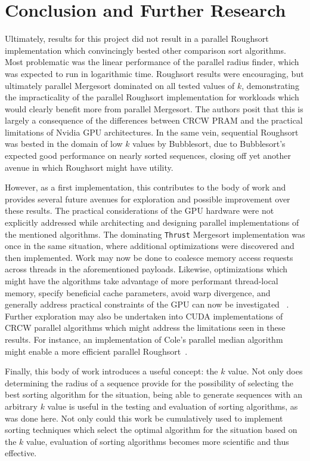 \documentclass[letterpaper, 12pt]{article}
\let\supercite\cite
\renewcommand{\cite}[1]{\textnormal{~\supercite{#1}}}
\begin{document}
\section{Conclusion and Further Research}
  Ultimately, results for this project did not result in a parallel Roughsort implementation which convincingly bested other comparison sort 
  algorithms. Most problematic was the linear performance of the parallel radius finder, which was expected to run in logarithmic time.  Roughsort
  results were encouraging, but ultimately parallel Mergesort dominated on all tested values of $k$, demonstrating the impracticality of the
  parallel Roughsort implementation for workloads which would clearly benefit more from parallel Mergesort.  The authors posit that this is 
  largely a consequence of the differences between CRCW PRAM and the practical limitations of Nvidia GPU architectures.  
  In the same vein, sequential Roughsort was bested in the domain of low $k$ values by Bubblesort, due to Bubblesort's expected good performance
  on nearly sorted sequences, closing off yet another avenue in which Roughsort might have utility.
  
  However, as a first implementation, this contributes to the body of work and provides several future avenues for exploration and possible 
  improvement over these results.
  The practical considerations of the GPU hardware were not explicitly addressed while architecting and designing parallel implementations of
  the mentioned algorithms.  The dominating \texttt{Thrust} Mergesort implementation was once in the same situation, where additional optimizations
  were discovered and then implemented.  Work may now be done to coalesce memory access requests across threads in the aforementioned payloads.
  Likewise, optimizations which might have the algorithms take advantage of more performant thread-local memory, specify beneficial cache 
  parameters, avoid warp divergence, and generally address practical constraints of the GPU can now be investigated \cite{cuda}.  Further 
  exploration may also be undertaken into CUDA implementations of CRCW parallel algorithms which might address the limitations seen in these 
  results.  For instance, an implementation of Cole's parallel median algorithm might enable a more efficient parallel Roughsort\cite{cole85}.
  
  Finally, this body of work introduces a useful concept: the $k$ value.  Not only does determining the radius of a sequence provide for the 
  possibility of selecting the best sorting algorithm for the situation, being able to generate sequences with an arbitrary $k$ value is useful
  in the testing and evaluation of sorting algorithms, as was done here.  Not only could this work be cumulatively used to implement sorting 
  techniques which select the optimal algorithm for the situation based on the $k$ value, evaluation of sorting algorithms becomes more scientific
  and thus effective.

\clearpage

\nocite{*}
\end{document}
